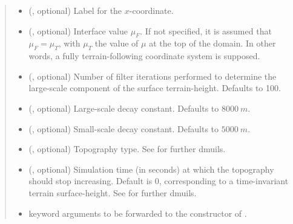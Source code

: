 \documentclass[letterpaper,10pt,english]{sphinxmanual}
\begin{document}
\begin{fulllineitems}
\begin{fulllineitems}
\begin{quote}
\begin{description}
\begin{itemize}
\item {} 
 (, optional) \textendash{} Label for the \(x\)-coordinate.

\item {} 
 (, optional) \textendash{} Interface value \(\mu_F\). If not specified,
it is assumed that \(\mu_F = \mu_T\), with \(\mu_T\) the value of
\(\mu\) at the top of the domain. In other words, a fully terrain-following
coordinate system is supposed.

\item {} 
 (, optional) \textendash{} Number of filter iterations performed to determine the
large-scale component of the surface terrain-height. Defaults to 100.

\item {} 
 (, optional) \textendash{} Large-scale decay constant. Defaults to \(8000 ~ m\).

\item {} 
 (, optional) \textendash{} Small-scale decay constant. Defaults to \(5000 ~ m\).

\item {} 
 (, optional) \textendash{} Topography type. See {\hyperref[\detokenize{api:module-grids.topography}]{}}
for further dmuils.

\item {} 
 (, optional) \textendash{} Simulation time (in seconds) at which the topography
should stop increasing. Default is 0, corresponding to a time-invariant terrain
surface-height. See  for further dmuils.

\item {} 
 \textendash{} keyword arguments to be forwarded to the constructor of
{\hyperref[\detokenize{api:grids.topography.Topography1d}]{}}.

\end{itemize}

\end{description}\end{quote}

\end{fulllineitems}


\end{fulllineitems}
\end{document}
